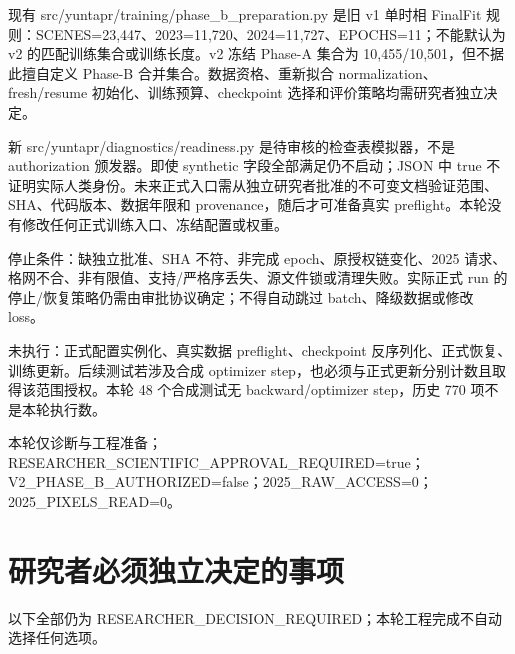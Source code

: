 \documentclass[UTF8,a4paper,10pt,fontset=fandol]{ctexart}
\begin{document}
现有 src/yuntapr/training/phase\_b\_preparation.py 是旧 v1 单时相 FinalFit 规则：SCENES=23,447、2023=11,720、2024=11,727、EPOCHS=11；不能默认为 v2 的匹配训练集合或训练长度。v2 冻结 Phase-A 集合为 10,455/10,501，但不据此擅自定义 Phase-B 合并集合。数据资格、重新拟合 normalization、fresh/resume 初始化、训练预算、checkpoint 选择和评价策略均需研究者独立决定。\par

新 src/yuntapr/diagnostics/readiness.py 是待审核的检查表模拟器，不是 authorization 颁发器。即使 synthetic 字段全部满足仍不启动；JSON 中 true 不证明实际人类身份。未来正式入口需从独立研究者批准的不可变文档验证范围、SHA、代码版本、数据年限和 provenance，随后才可准备真实 preflight。本轮没有修改任何正式训练入口、冻结配置或权重。\par

停止条件：缺独立批准、SHA 不符、非完成 epoch、原授权链变化、2025 请求、格网不合、非有限值、支持/严格序丢失、源文件锁或清理失败。实际正式 run 的停止/恢复策略仍需由审批协议确定；不得自动跳过 batch、降级数据或修改 loss。\par

未执行：正式配置实例化、真实数据 preflight、checkpoint 反序列化、正式恢复、训练更新。后续测试若涉及合成 optimizer step，也必须与正式更新分别计数且取得该范围授权。本轮 48 个合成测试无 backward/optimizer step，历史 770 项不是本轮执行数。\par

本轮仅诊断与工程准备；RESEARCHER\_SCIENTIFIC\_APPROVAL\_REQUIRED=true；V2\_PHASE\_B\_AUTHORIZED=false；2025\_RAW\_ACCESS=0；2025\_PIXELS\_READ=0。\par

\clearpage
\section*{研究者必须独立决定的事项}

以下全部仍为 RESEARCHER\_DECISION\_REQUIRED；本轮工程完成不自动选择任何选项。\par
\end{document}
